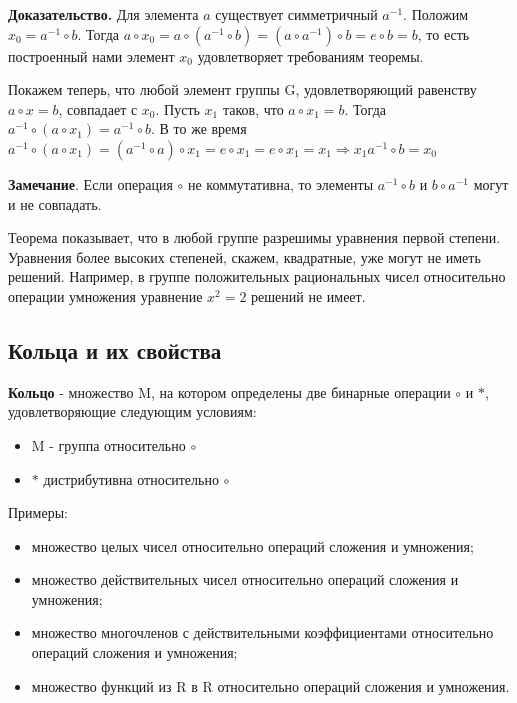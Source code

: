 \documentclass[a4paper]{article}
\begin{document}
    \begin{hproof}
        \textbf{Доказательство.}  Для элемента $a$ существует симметричный $a^{-1}$. Положим
        $x_0 = a^{-1} \circ b.$ Тогда
        $a \circ x_0 = a \circ (a^{-1} \circ b) = (a \circ a^{-1} ) \circ b = e \circ b = b$, то есть построенный нами элемент $x_0$ удовлетворяет требованиям теоремы.

        Покажем теперь, что любой элемент группы G, удовлетворяющий равенству $a \circ x = b$, совпадает с $x_0$. Пусть $x_1$ таков, что $a \circ x_1 = b$. Тогда $a^{-1} \circ (a \circ x_1) = a^{-1} \circ b$. В то же время $a^{-1} \circ (a \circ x_1) = (a^{-1} \circ a) \circ x_1 = e \circ x_1 = e \circ x_1 = x_1 \Rightarrow x_1 a^{-1} \circ b = x_0$

        \textbf{Замечание}. Если операция $\circ$  не коммутативна, то элементы $a^{-1} \circ b$ и $b \circ a^{-1}$ могут и не совпадать.
    \end{hproof}

    Теорема показывает, что в любой группе разрешимы уравнения первой
    степени. Уравнения более высоких степеней, скажем, квадратные, уже могут не
    иметь решений. Например, в группе положительных рациональных чисел
    относительно операции умножения уравнение $x^2 = 2$ решений не имеет.


    \newpage \begin{center}
                 \begin{Large}
                 \end{Large}
    \end{center}

    \subsection*{Кольца и их свойства}
    \textbf{Кольцо} - множество M, на котором определены две бинарные операции $\circ$ и $*$, удовлетворяющие следующим условиям:
    \begin{itemize}
        \item M - группа относительно $\circ$
        \item $*$ дистрибутивна относительно $\circ$
    \end{itemize}

    Примеры:
    \begin{itemize}
        \item множество целых чисел относительно операций сложения и умножения;
        \item множество действительных чисел относительно операций сложения и
        умножения;
        \item множество многочленов с действительными коэффициентами
        относительно операций сложения и умножения;
        \item множество функций из R в R относительно операций сложения и умножения.
    \end{itemize}
\end{document}
